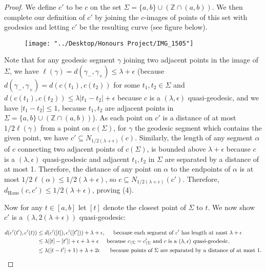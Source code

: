 \documentclass[12pt]{article}
\newcommand{\vs}{\vskip10pt}
\begin{document}
	\begin{proof}
		
		We define $c'$ to be $c$ on the set $\Sigma = \{a,b\} \cup (\mathbb{Z} \cap (a,b))$. We then complete our definition of $c'$ by joining the $c$-images of points of this set with geodesics and letting $c'$ be the resulting curve (see figure below). 
		
\begin{figure} [h]
	\centering
	\texttt{[image: "../Desktop/Honours Project/IMG\_1505"]}
	\caption{}
	\label{fig:img1505}
\end{figure}
		
		\vs
		
		Note that for any geodesic segment $\gamma$ joining two adjacent points in the image of $\Sigma$, we have $\ell(\gamma) = d(\gamma_{-}, \gamma_{+}) \leq \lambda + \epsilon$ (because $d(\gamma_{-}, \gamma_{+}) = d(c(t_1), c(t_2))$ for some $t_1, t_2 \in \Sigma$ and $d(c(t_1), c(t_2)) \leq \lambda \vert t_1 - t_2 \vert + \epsilon$ because $c$ is a $(\lambda, \epsilon)$ quasi-geodesic, and we have $\vert t_1 - t_2 \vert \leq 1$, because $t_1, t_2$ are adjacent points in $\Sigma = \{a,b\} \cup (\mathbb{Z} \cap (a,b))$). As each point on $c'$ is a distance of at most $1/2 \ell(\gamma)$ from a point on $c(\Sigma)$, for $\gamma$ the geodesic segment which contains the given point, we have $c' \subseteq N_{1/2 (\lambda + \epsilon)} (c)$. Similarly, the length of any segment $\alpha$ of $c$ connecting two adjacent points of $c(\Sigma)$, is bounded above $\lambda + \epsilon$ because $c$ is a $(\lambda, \epsilon)$ quasi-geodesic and adjacent $t_1, t_2$ in $\Sigma$ are separated by a distance of at most 1. Therefore, the distance of any point on $\alpha$ to the endpoints of $\alpha$ is at most $1/2 \ell(\alpha) \leq 1/2 (\lambda + \epsilon)$, so $c \subseteq N_{1/2 (\lambda + \epsilon)} (c')$. Therefore, $d_{\text{Haus}}(c, c') \leq 1/2 (\lambda + \epsilon)$, proving (4). 
		
		\vs 
		
		Now for any $t \in [a,b]$ let $[t]$ denote the closest point of $\Sigma$ to $t$. We now show $c'$ is a $(\lambda, 2(\lambda + \epsilon))$ quasi-geodesic: 
		
		\vs 
		
		\begin{align*}
		d(c'(t'), c'(t)) &\leq d(c'([t]), c'([t'])) + \lambda + \epsilon, \hspace{0.5cm} \text{because each segment of } c' \text{ has length at most } \lambda + \epsilon \\
		&\leq \lambda \vert [t] - [t'] \vert + \epsilon + \lambda + \epsilon \hspace{0.5cm} \text{because } c_{\restriction \Sigma} = c'_{\restriction \Sigma} \text{ and } c \text{ is a } (\lambda, \epsilon) \text{ quasi-geodesic}. \\
		&\leq \lambda( \vert t - t' \vert + 1) + \lambda + 2 \epsilon \hspace{0.5cm} \text{ because points of } \Sigma \text{ are separated by a distance of at most } 1. 
 		\end{align*}
 		

\end{proof}
\end{document}
